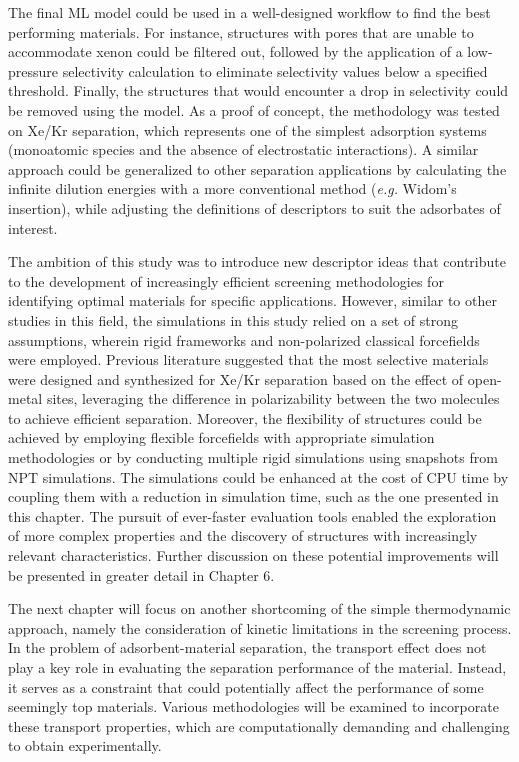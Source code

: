 \documentclass[main]{subfiles}
\begin{document}
The final ML model could be used in a well-designed workflow to find the best performing materials. For instance, structures with pores that are unable to accommodate xenon could be filtered out, followed by the application of a low-pressure selectivity calculation to eliminate selectivity values below a specified threshold. Finally, the structures that would encounter a drop in selectivity could be removed using the model. As a proof of concept, the methodology was tested on Xe/Kr separation, which represents one of the simplest adsorption systems (monoatomic species and the absence of electrostatic interactions). A similar approach could be generalized to other separation applications by calculating the infinite dilution energies with a more conventional method (\emph{e.g.} Widom's insertion), while adjusting the definitions of descriptors to suit the adsorbates of interest.

The ambition of this study was to introduce new descriptor ideas that contribute to the development of increasingly efficient screening methodologies for identifying optimal materials for specific applications. However, similar to other studies in this field, the simulations in this study relied on a set of strong assumptions, wherein rigid frameworks and non-polarized classical forcefields were employed. Previous literature suggested that the most selective materials were designed and synthesized  for Xe/Kr separation based on the effect of open-metal sites, leveraging the difference in polarizability between the two molecules to achieve efficient separation.\autocite{Li_2019, Pei_2022} Moreover, the flexibility of structures could be achieved by employing flexible forcefields with appropriate simulation methodologies\autocite{Bousquet2012} or by conducting multiple rigid simulations using snapshots from NPT simulations\autocite{Witman_2017}. The simulations could be enhanced at the cost of CPU time by coupling them with a reduction in simulation time, such as the one presented in this chapter. The pursuit of ever-faster evaluation tools enabled the exploration of more complex properties and the discovery of structures with increasingly relevant characteristics. Further discussion on these potential improvements will be presented in greater detail in Chapter 6.

\begin{center}
\end{center}

The next chapter will focus on another shortcoming of the simple thermodynamic approach, namely the consideration of kinetic limitations in the screening process. In the problem of adsorbent-material separation, the transport effect does not play a key role in evaluating the separation performance of the material. Instead, it serves as a constraint that could potentially affect the performance of some seemingly top materials. Various methodologies will be examined to incorporate these transport properties, which are computationally demanding and challenging to obtain experimentally.

\OnlyInSubfile{\printglobalbibliography}
\end{document}
